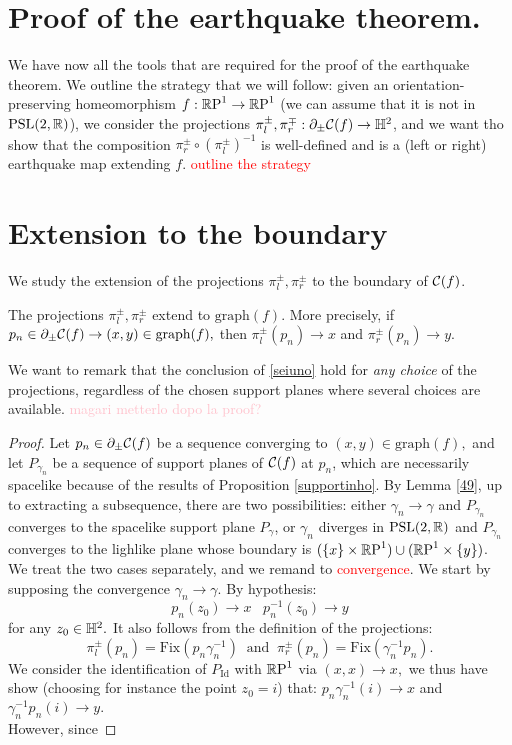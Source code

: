 \section{Proof of the earthquake theorem.}

We have now all the tools that are required for the proof of the earthquake theorem. We outline the strategy that we will follow: given an orientation-preserving homeomorphism $f:\S\to\S$ (we can assume that it is not in $\PSL$), we consider the projections $\pi_{l}^\pm,\pi_r^\mp:\partial_\pm\CF\to\H^2$, and we want tho show that the composition $\pi_r^\pm\circ(\pi_l^\pm)^{-1}$  is well-defined and is a (left or right) earthquake map extending $f$. \textcolor{red}{outline the strategy}

\section{Extension to the boundary}
We study the extension of the projections $\pi_l^\pm,\pi_r^\pm$ to the boundary of $\CF$. 

\begin{proposition}\label{seiuno}
    The projections $\pi_l^\pm,\pi_r^\pm$ extend to $\text{graph}(f)$. More precisely, if $p_n\in\partial_\pm\CF\to(x,y)\in\text{graph}(f),$ then $\pi_l^\pm(p_n)\to x$ and $\pi_r^\pm(p_n)\to y$.
\end{proposition}

We want to remark that the conclusion of \ref{seiuno} hold for \textit{any choice} of the projections, regardless of the chosen support planes where several choices are available. \textcolor{pink}{magari metterlo dopo la proof?}

\begin{proof}
    Let $p_n\in\partial_\pm\CF$ be a sequence converging to $(x,y)\in\text{graph}(f),$ and let $P_{\gamma_n}$ be a sequence of support planes of $\CF$ at $p_n$, which are necessarily spacelike because of the results of Proposition \ref{supportinho}. By Lemma \ref{49}, up to extracting a subsequence, there are two possibilities: either $\gamma_n\to\gamma$ and $P_{\gamma_n}$ converges to the spacelike support plane $P_\gamma$, or $\gamma_n$ diverges in $\PSL$ and $P_{\gamma_n}$ converges to the lighlike plane whose boundary is $(\{x\}\times\S)\cup(\S\times\{y\})$. We treat the two cases separately, and we remand to \textcolor{red}{convergence}.
    We start by supposing the convergence $\gamma_n\to\gamma.$ By hypothesis: 
    \begin{equation}\label{18}
        p_n(z_0)\to x \;\;\; p_n^{-1}(z_0)\to y
    \end{equation}
    for any $z_0\in\H^2.$ It also follows from the definition of the projections: 
    \begin{equation}\label{19}
        \pi_l^\pm(p_n)=\text{Fix}(p_n\gamma_n^{-1}) \;\; \text{and}\;\; \pi_r^\pm(p_n)=\text{Fix}(\gamma_n^{-1}p_n).
    \end{equation}
  We consider the identification of $P_\text{Id}$ with $\S$ via $(x,x)\to x,$ we thus have show (choosing for instance the point $z_0=i$) that: $p_n\gamma_n^{-1}(i)\to x$ and $\gamma_n^{-1}p_n(i)\to y.$ \\
  However, since 
\end{proof}

